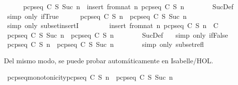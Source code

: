\begin{isabellebody}
\ \ \ \ \isamarkupfalse%
\ {\isachardoublequoteopen}pcp{\isacharunderscore}seq\ C\ S\ {\isacharparenleft}Suc\ n{\isacharparenright}\ {\isacharequal}\ insert\ {\isacharparenleft}from{\isacharunderscore}nat\ n{\isacharparenright}\ {\isacharparenleft}pcp{\isacharunderscore}seq\ C\ S\ n{\isacharparenright}{\isachardoublequoteclose}\isanewline
\ \ \ \ \ \ \isamarkupfalse%
\ SucDef\ {}\ \isamarkupfalse%
\ {\isacharparenleft}simp\ only{\isacharcolon}\ if{\isacharunderscore}True{\isacharparenright}\isanewline
\ \ \ \ \isamarkupfalse%
\ {\isachardoublequoteopen}pcp{\isacharunderscore}seq\ C\ S\ n\ {\isasymsubseteq}\ pcp{\isacharunderscore}seq\ C\ S\ {\isacharparenleft}Suc\ n{\isacharparenright}{\isachardoublequoteclose}\isanewline
\ \ \ \ \ \ \isamarkupfalse%
\ {\isacharparenleft}simp\ only{\isacharcolon}\ subset{\isacharunderscore}insertI{\isacharparenright}\isanewline
\ \ \isamarkupfalse%
\isanewline
\ \ \ \ \isamarkupfalse%
\ {}{\isacharcolon}{\isachardoublequoteopen}insert\ {\isacharparenleft}from{\isacharunderscore}nat\ n{\isacharparenright}\ {\isacharparenleft}pcp{\isacharunderscore}seq\ C\ S\ n{\isacharparenright}\ {\isasymnotin}\ C{\isachardoublequoteclose}\isanewline
\ \ \ \ \isamarkupfalse%
\ {\isachardoublequoteopen}pcp{\isacharunderscore}seq\ C\ S\ {\isacharparenleft}Suc\ n{\isacharparenright}\ {\isacharequal}\ pcp{\isacharunderscore}seq\ C\ S\ n{\isachardoublequoteclose}\isanewline
\ \ \ \ \ \ \isamarkupfalse%
\ SucDef\ {}\ \isamarkupfalse%
\ {\isacharparenleft}simp\ only{\isacharcolon}\ if{\isacharunderscore}False{\isacharparenright}\isanewline
\ \ \ \ \isamarkupfalse%
\ {\isachardoublequoteopen}pcp{\isacharunderscore}seq\ C\ S\ n\ {\isasymsubseteq}\ pcp{\isacharunderscore}seq\ C\ S\ {\isacharparenleft}Suc\ n{\isacharparenright}{\isachardoublequoteclose}\isanewline
\ \ \ \ \ \ \isamarkupfalse%
\ {\isacharparenleft}simp\ only{\isacharcolon}\ subset{\isacharunderscore}refl{\isacharparenright}\isanewline
\ \ \isamarkupfalse%
\isanewline
{}\isamarkupfalse%
%
\endisatagproof
{\isafoldproof}%
%
\isadelimproof
%
\endisadelimproof
%
\begin{isamarkuptext}%
Del mismo modo, se puede probar automáticamente en Isabelle/HOL.%
\end{isamarkuptext}\isamarkuptrue%
\isamarkupfalse%
\ pcp{\isacharunderscore}seq{\isacharunderscore}monotonicity{\isacharcolon}{\isachardoublequoteopen}pcp{\isacharunderscore}seq\ C\ S\ n\ {\isasymsubseteq}\ pcp{\isacharunderscore}seq\ C\ S\ {\isacharparenleft}Suc\ n{\isacharparenright}{\isachardoublequoteclose}\isanewline

\end{isabellebody}
